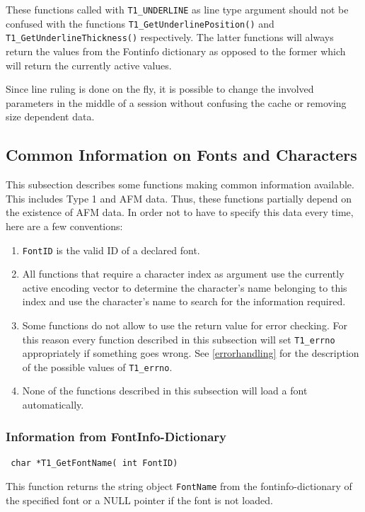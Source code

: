 These functions called with \verb+T1_UNDERLINE+ as line type argument should
not be confused with the functions \verb+T1_GetUnderlinePosition()+ and
\verb+T1_GetUnderlineThickness()+ respectively. The latter functions will
always return the values from the Fontinfo dictionary as opposed to the former
which will return the currently active values. 

Since line ruling is done on the fly, it is possible to change the involved
parameters in the middle of a session without confusing the cache or removing
size dependent data.


\subsection{Common Information on Fonts and Characters}
\label{common}%
This subsection describes some functions making common information
available. This includes Type 1 and AFM data. Thus, these
functions partially depend on the existence of AFM data. In order not
to have to specify this data every time, here are a few conventions:
\begin{enumerate}
\item \verb+FontID+ is the valid ID of a declared font.   
\item All functions that require a character index as argument
  use the currently active encoding vector to determine the
  character's name 
  belonging to this index and use the character's name to search for the
  information required.
\item Some functions do not allow to use the return value for error
  checking. For this reason every function described in this subsection will
  set \verb+T1_errno+ appropriately if something goes wrong. See
  \ref{errorhandling} for the description of the possible values of
  \verb+T1_errno+. 
\item None of the functions described in this subsection will load a font
  automatically. 
\end{enumerate}

\subsubsection{Information from FontInfo-Dictionary}
\label{fontinfodict}
\precorr
\begin{verbatim}
 char *T1_GetFontName( int FontID)
\end{verbatim}\postcorr
This function returns the string object \verb+FontName+ from the
fontinfo-dictionary of the specified font or a NULL pointer if the font is not
loaded.

